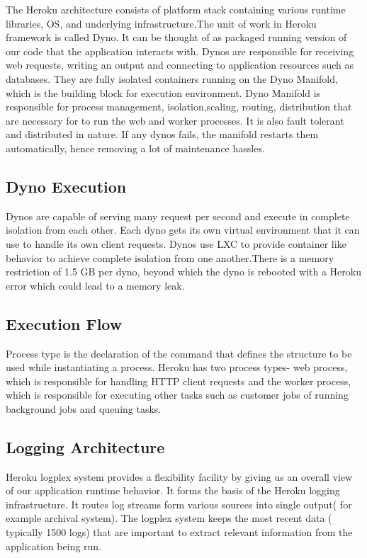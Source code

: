\documentclass[9pt,twocolumn,twoside]{../../styles/osajnl}
\begin{document}
	The Heroku architecture consists of platform stack containing various runtime
	libraries, OS, and underlying infrastructure.The unit of work in Heroku
	framework is called Dyno. It can be thought of as packaged running version of
	our code that the application interacts with. Dynos are responsible for
	receiving web requests, writing an output and connecting to application
	resources such as databases. They are fully isolated containers running on the
	Dyno Manifold, which is the building block for execution environment. Dyno
	Manifold is responsible for process management, isolation,scaling, routing,
	distribution that are necessary for to run the web and worker processes. It is
	also fault tolerant and distributed in nature. If any dynos fails, the manifold
	restarts them automatically, hence removing a lot of maintenance hassles.

\subsection{Dyno Execution}
	 Dynos are capable of serving many request per second and execute in complete
	 isolation from each other. Each dyno gets its own virtual environment that it
	 can use to handle its own client requests. Dynos use LXC to provide container
	 like behavior to achieve complete isolation from one another.There is a memory
	 restriction of 1.5 GB per dyno, beyond which the dyno is rebooted with a
	 Heroku error which could lead to a memory leak.

\subsection{Execution Flow}
	Process type is the declaration of the command that defines the structure to be
	used while instantiating a process. Heroku has two process types- web process,
	which is responsible for handling HTTP client requests and the worker process,
	which is responsible for executing other tasks such as customer jobs of running
	background jobs and queuing tasks.



\subsection{Logging Architecture}
	Heroku logplex system provides a flexibility facility by giving us an overall
	view of our application runtime behavior. It forms the basis of the Heroku
	logging  infrastructure. It routes log streams form various sources into single
	output( for example archival system). The logplex system keeps the most recent
	data ( typically 1500 logs) that are important to extract relevant information
	from the application  being run.
\end{document}
